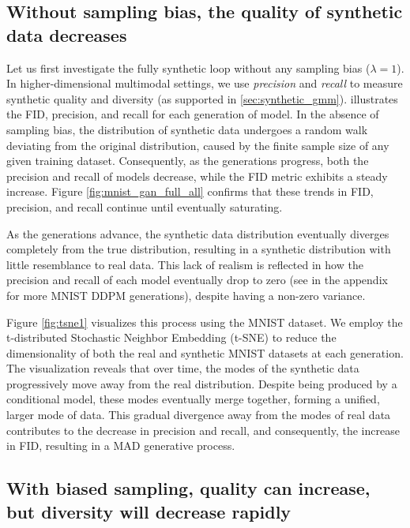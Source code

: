 \documentclass{article}
\def\bias{{\lambda}}
\def\colorSynthetic{colorA}
\def\synthetic{\textcolor{\colorSynthetic}{fully synthetic loop}}
\begin{document}
        

\subsection{Without sampling bias, the quality of synthetic data decreases}

Let us first investigate the \synthetic{} without any sampling bias ($\bias = 1$). In higher-dimensional multimodal settings, we use \textit{precision} and \textit{recall} to measure synthetic quality and diversity (as supported in \cref{sec:synthetic_gmm}).  illustrates the FID, precision, and recall for each generation of model. In the absence of sampling bias, the distribution of synthetic data undergoes a random walk deviating from the original distribution, caused by the finite sample size of any given training dataset. Consequently, as the generations progress, both the precision and recall of models decrease, while the FID metric exhibits a steady increase. Figure \ref{fig:mnist_gan_full_all} confirms that these trends in FID, precision, and recall continue until eventually saturating.

As the generations advance, the synthetic data distribution eventually diverges completely from the true distribution, resulting in a synthetic distribution with little resemblance to real data. This lack of realism is reflected in how the precision and recall of each model eventually drop to zero (see  in the appendix for more MNIST DDPM generations), despite having a non-zero variance. 

Figure \ref{fig:tsne1} visualizes this process using the MNIST dataset. We employ the t-distributed Stochastic Neighbor Embedding (t-SNE) \cite{van2008visualizing} to reduce the dimensionality of both the real and synthetic MNIST datasets at each generation. The visualization reveals that over time, the modes of the synthetic data progressively move away from the real distribution. Despite being produced by a conditional model, these modes eventually merge together, forming a unified, larger mode of data. This gradual divergence away from the modes of real data contributes to the decrease in precision and recall, and consequently, the increase in FID, resulting in a MAD generative process. 



\subsection{With biased sampling, quality can increase, but diversity will decrease rapidly}
\label{sec:synthetic_biased}
\end{document}
